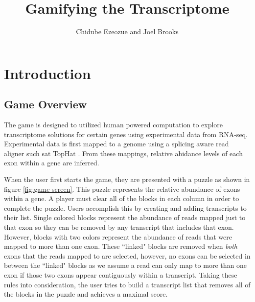 \documentclass[12pt,twocolumn]{article}
\title{Gamifying the Transcriptome}
\author{Chidube Ezeozue and Joel Brooks}
\begin{document}

\renewcommand\refname{Bibliography}
\maketitle

\begin{abstract}

\end{abstract}

\section*{Introduction}

\subsection*{Game Overview}
The game is designed to utilized human powered computation to explore transcriptome solutions for certain genes using experimental data from
RNA-seq. Experimental data is first mapped to a genome using a splicing aware read aligner such sat TopHat \citep{trapnell2009tophat}. From these mappings,
relative abidance levels of each exon within a gene are inferred.

When the user first starts the game, they are presented with a puzzle as shown in figure \ref{fig:game screen}. This puzzle represents
the relative abundance of exons within a gene. A player must clear all of the blocks in each column in order to complete the puzzle. Users accomplish this by 
creating and adding transcripts to their list. Single colored blocks represent the abundance of reads mapped just to that exon so they can be removed by any 
transcript that includes that exon. However, blocks with two colors represent the abundance of reads that were mapped to more than one exon. These ``linked"
blocks are removed when \emph{both} exons that the reads mapped to are selected, however, no exons can be selected in between the ``linked" blocks as
we assume a read can only map to more than one exon if those two exons appear contiguously within a transcript. Taking these rules into consideration, the user
tries to build a transcript list that removes all of the blocks in the puzzle and achieves a maximal score.
\end{document}
